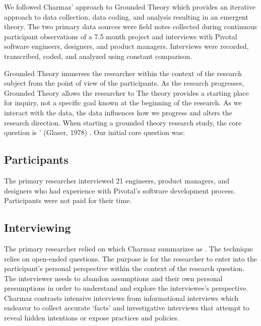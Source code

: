 We followed Charmaz' approach to Grounded Theory \cite{Charmaz} which provides an iterative approach to data collection, data coding, and analysis resulting in an emergent theory. The two primary data sources were field notes collected during continuous participant observations of a 7.5 month project and interviews with Pivotal software engineers, designers, and product managers. Interviews were recorded, transcribed, coded, and analyzed using constant comparison. 

Grounded Theory immerses the researcher within the context of the research subject from the point of view of the participants. As the research progresses, Grounded Theory allows the researcher to  The theory provides a starting place for inquiry, not a specific goal known at the beginning of the research. As we interact with the data, the data influences how we progress and alters the research direction. When starting a grounded theory research study, the core question is ' (Glaser, 1978) \cite{GlaserTheoreticalSensitivity}. Our initial core question was: 

\subsection{Participants}
The primary researcher interviewed 21 engineers, product managers, and designers who had experience with Pivotal's software development process. Participants were not paid for their time. 
\subsection{Interviewing}
The primary researcher relied on  which Charmaz summarizes as  \cite{Charmaz}. The technique relies on open-ended questions. The purpose is for the researcher to enter into the participant's personal perspective within the context of the research question. The interviewer needs to abandon assumptions and their own personal presumptions in order to understand and explore the interviewee's perspective. Charmaz \cite{Charmaz} contrasts intensive interviews from informational interviews which endeavor to collect accurate `facts' and investigative interviews that attempt to reveal hidden intentions or expose practices and policies. 
 

